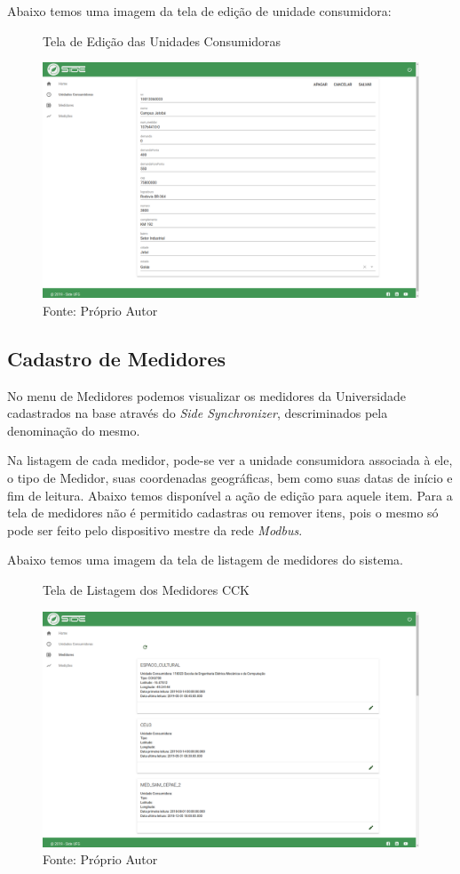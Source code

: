 \newpage

Abaixo temos uma imagem da tela de edição de unidade consumidora:

\begin{figure}[H]
    \centering
    \caption{Tela de Edição das Unidades Consumidoras}
\includegraphics[width=\linewidth]{imagens/side/side-uc-edit.png}
    \caption*{Fonte: Próprio Autor}
    \label{fig:side-uc-edit}
\end{figure}

\subsection{Cadastro de Medidores}

No menu de Medidores podemos visualizar os medidores da Universidade cadastrados na base através do \textit{Side Synchronizer}, descriminados pela denominação do mesmo.

Na listagem de cada medidor, pode-se ver a unidade consumidora associada à ele, o tipo de Medidor, suas coordenadas geográficas, bem como suas datas de início e fim de leitura. Abaixo temos disponível a ação de edição para aquele item. Para a tela de medidores não é permitido cadastras ou remover itens, pois o mesmo só pode ser feito pelo dispositivo mestre da rede \textit{Modbus}.

Abaixo temos uma imagem da tela de listagem de medidores do sistema.

\begin{figure}[H]
    \centering
    \caption{Tela de Listagem dos Medidores CCK}
\includegraphics[width=0.75\linewidth]{imagens/side/side-medidor-list.png}
    \caption*{Fonte: Próprio Autor}
    \label{fig:side-medidor-list}
\end{figure}

